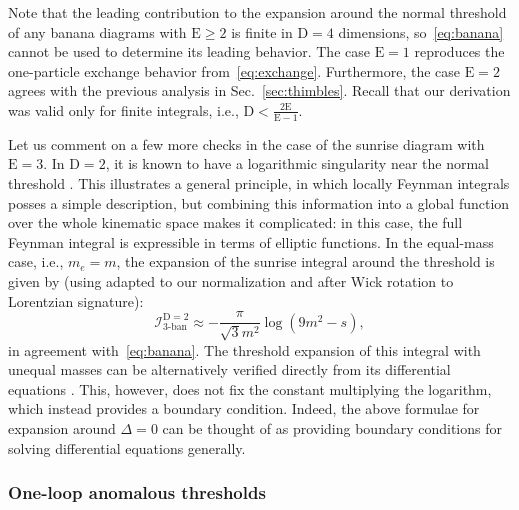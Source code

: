 \documentclass[12pt]{article}
\numberwithin{figure}{section}
\def \be {\begin{equation}}
\def \ee {\end{equation}}
\def \D {\mathrm{D}}
\def \E {\mathrm{E}}
\def \geq {\geqslant}
\def \I {\mathcal{I}}
\begin{document}
				Note that the leading contribution to the expansion around the normal threshold of any banana diagrams with $\E \geq 2$ is finite in $\D=4$ dimensions, so~\eqref{eq:banana} cannot  be used to determine its leading behavior.
				The case $\E=1$ reproduces the one-particle exchange behavior from~\eqref{eq:exchange}.
				Furthermore, the case $\E=2$ agrees with the previous analysis in Sec.~\ref{sec:thimbles}. Recall that our derivation was valid only for finite integrals, i.e., $\D < \frac{2\E}{\E-1}$. 
				
				Let us comment on a few more checks in the case of the sunrise diagram with $\E=3$.
				In $\D=2$, it is known to have a logarithmic singularity near the normal threshold \cite[Sec.~10]{Laporta:2004rb}. This illustrates a general principle, in which locally Feynman integrals posses a simple description, but combining this information into a global function over the whole kinematic space makes it complicated: in this case, the full Feynman integral is expressible in terms of elliptic functions. In the equal-mass case, i.e., $m_e = m$, the expansion of the sunrise integral around the threshold is given by (using \cite{Laporta:2004rb} adapted to our normalization and after Wick rotation to Lorentzian signature):
				\be
				\I_{3\text{-ban}}^{\D=2}\approx -\frac{\pi}{\sqrt{3} m^2}  \log \left(9m^2-s\right),
				\ee
				in agreement with~\eqref{eq:banana}.
				The threshold expansion of this integral with unequal masses can be alternatively verified directly from its differential equations \cite{Laporta:2004rb,Muller-Stach:2011qkg}. This, however, does not fix the constant multiplying the logarithm, which instead provides a boundary condition.
				Indeed, the above formulae for expansion around $\Delta=0$ can be thought of as providing boundary conditions for solving differential equations generally.
				
				
				
				\subsubsection{\label{sec:one-loop}One-loop anomalous thresholds}
		
\end{document}
